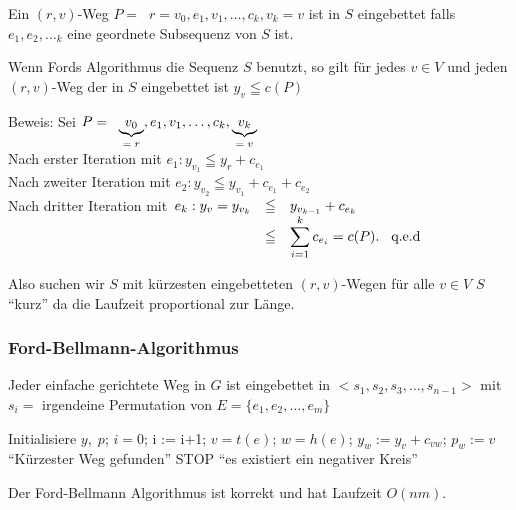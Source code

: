 Ein $(r,v)$-Weg $P= \; \; r=v_{0}, e_{1}, v_{1}, \ldots, c_{k}, v_{k} = v$
ist in $S$ eingebettet falls $e_{1}, e_{2},\ldots_{k}$ eine geordnete
Subsequenz von $S$ ist.

\begin{lemma} \label{Ford2}
Wenn Fords Algorithmus die Sequenz $S$ benutzt, so gilt für jedes $v \in V$
und jeden $(r,v)$-Weg der in $S$ eingebettet ist $y_{v} \leqq c(P)$
\end{lemma}

Beweis: Sei $P = \; \;  \underbrace{v_{0}}_{\mbox{\scriptsize$=r$}}, 
e_{1}, v_{1}, \ldots, c_{k}, \underbrace {v_{k}}_{\mbox{\scriptsize $= v$}}$\\
Nach erster Iteration mit $e_{1}: y_{v_{1}} \leqq y_{r} + c_{e_{1}}$\\
Nach zweiter Iteration mit $e_{2}: y_{v_{2}} \leqq y_{v_{1}} + c_{e_{1}}+ 
c_{e_{2}}$\\
Nach dritter Iteration mit$\begin{array}[t]{rcl}e_{k}: y_{v} = y_{v_{k}} &\leqq & y_{v_{k-1}} + c_{e_{k}}\\
&\leqq & \displaystyle \sum_{i=1}^{k} c_{e_{i}} = c(P). \hspace{3mm}
\mbox{q.e.d}\end{array}$

Also suchen wir $S$ mit kürzesten eingebetteten $(r,v)$-Wegen für alle $v
\in V$ $S$
"`kurz"' da die Laufzeit proportional zur Länge.

\subsubsection{Ford-Bellmann-Algorithmus}

Jeder einfache gerichtete Weg in $G$ ist eingebettet in
$<s_{1},s_{2},s_{3},
\ldots, s_{n-1} >$ mit $s_{i} =$ irgendeine Permutation von $E= \{ e_{1},
e_{2}, \ldots, e_{m}\}$

\begin{algorithmic}
\STATE Initialisiere $y, \; p$;
\STATE $i=0$;
\STATE i := i+1;
\STATE $v=t(e)$; $w=h(e)$;
\STATE $y_{w} := y_{v} + c_{v w}$; $p_{w} := v$
\ENDIF
\ENDFOR
\ENDWHILE
{} 
\STATE "`Kürzester Weg gefunden"'
\ELSE 
\STATE STOP "`es existiert ein negativer Kreis"'
\ENDIF
\end{algorithmic}


\begin{satz}
Der Ford-Bellmann Algorithmus ist korrekt und hat Laufzeit $O(n m)$.
\end{satz}

